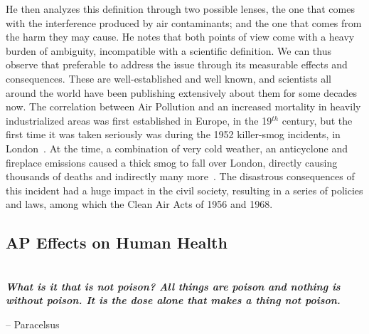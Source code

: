 He then analyzes this definition through two possible lenses, the one
that comes with the interference produced by air contaminants; and the
one that comes from the harm they may cause. He notes that both points
of view come with a heavy burden of ambiguity, incompatible with a
scientific definition. We can thus observe that preferable to address
the issue through its measurable effects and consequences. These are
well-established and well known, and scientists all around the world
have been publishing extensively about them for some decades now. The
correlation between Air Pollution and an increased mortality in heavily
industrialized areas was first established in Europe, in the 19$^{th}$
century, but the first time it was taken seriously was during the 1952
killer-smog incidents, in London~\cite{Platt2007}. At the time, a
combination of very cold weather, an anticyclone and fireplace emissions
caused a thick smog to fall over London, directly causing thousands of
deaths and indirectly many more~\cite{Bell2008,Office2019}. The
disastrous consequences of this incident had a huge impact in the civil
society, resulting in a series of policies and laws, among which the
Clean Air Acts of 1956 and 1968.

\subsection{\acrlong{AP} Effects on Human Health}%
\label{sub:ap_effects_on_human_health}

\begin{flushright}
    \begin{minipage}{0.6\textwidth}
        ~\\[.5cm]
        \noindent
        \bfseries
        \textit{
            What is it that is not poison? All things are poison and
            nothing is without poison. It is the dose alone that makes a
            thing not poison.
        }

        \hfill-- Paracelsus
    \end{minipage}
\end{flushright}

